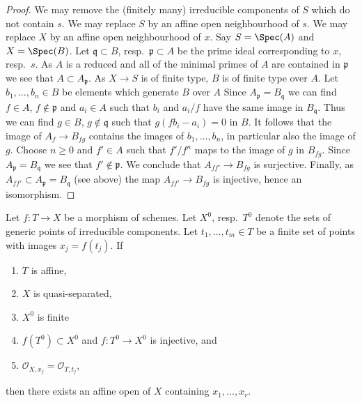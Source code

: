 \begin{proof}
We may remove the (finitely many) irreducible components of $S$
which do not contain $s$. We may replace $S$ by an affine open
neighbourhood of $s$. We may replace $X$ by an affine open neighbourhood
of $x$. Say $S = \Spec(A)$ and $X = \Spec(B)$. Let $\mathfrak q \subset B$,
resp.\ $\mathfrak p \subset A$ be the prime ideal corresponding to $x$,
resp.\ $s$. As $A$ is a reduced and all of the minimal primes of
$A$ are contained in $\mathfrak p$ we see that $A \subset A_\mathfrak p$.
As $X \to S$ is of finite type, $B$ is of finite type over $A$.
Let $b_1, \ldots, b_n \in B$ be elements which generate $B$ over $A$
Since $A_\mathfrak p = B_\mathfrak q$ we can find
$f \in A$, $f \not \in \mathfrak p$
and $a_i \in A$ such that $b_i$ and $a_i/f$ have the same image
in $B_\mathfrak q$. Thus we can find $g \in B$, $g \not \in \mathfrak q$
such that $g(fb_i - a_i) = 0$ in $B$. It follows that the image of
$A_f \to B_{fg}$ contains the images of $b_1, \ldots, b_n$, in
particular also the image of $g$.
Choose $n \geq 0$ and $f' \in A$ such that $f'/f^n$ maps
to the image of $g$ in $B_{fg}$. Since $A_\mathfrak p = B_\mathfrak q$
we see that $f' \not \in \mathfrak p$.
We conclude that $A_{ff'} \to B_{fg}$ is surjective.
Finally, as $A_{ff'} \subset A_\mathfrak p = B_\mathfrak q$ (see above)
the map $A_{ff'} \to B_{fg}$ is injective, hence an isomorphism.
\end{proof}

\begin{lemma}
\label{lemma-points-in-affine}
Let $f : T \to X$ be a morphism of schemes. Let $X^0$, resp.\ $T^0$
denote the sets of generic points of irreducible components.
Let $t_1, \ldots, t_m \in T$ be a finite set of points
with images $x_j = f(t_j)$. If
\begin{enumerate}
\item $T$ is affine,
\item $X$ is quasi-separated,
\item $X^0$ is finite
\item $f(T^0) \subset X^0$ and $f : T^0 \to X^0$ is injective, and
\item $\mathcal{O}_{X, x_j} = \mathcal{O}_{T, t_j}$,
\end{enumerate}
then there exists an affine open of $X$ containing $x_1, \ldots, x_r$.
\end{lemma}

